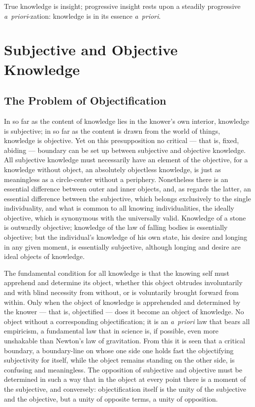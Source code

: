 \documentclass[12pt]{book}
\begin{document}
True knowledge is insight; progressive insight rests upon a steadily
progressive \textit{a~priori}-zation: knowledge is in its essence
\textit{a~priori}.

\chapter{Subjective and Objective Knowledge}

\section{The Problem of Objectification}
\label{sec:5}

\noindent In so far as the content of knowledge lies in the knower's own
interior, knowledge is subjective; in so far as the content is drawn from the
world of things, knowledge is objective. Yet on this presupposition no
critical --- that is, fixed, abiding --- boundary can be set up between
subjective and objective knowledge. All subjective knowledge must necessarily
have an element of the objective, for a knowledge without object, an absolutely
objectless knowledge, is just as meaningless as a circle-center without a
periphery. Nonetheless there is an essential difference between outer and inner
objects, and, as regards the latter, an essential difference between the
subjective, which belongs exclusively to the single individuality, and what is
common to all knowing individualities, the ideally objective, which is
synonymous with the universally valid. Knowledge of a stone is outwardly
objective; knowledge of the law of falling bodies is essentially objective; but
the individual's knowledge of his own state, his desire and longing in any
given moment, is essentially subjective, although longing and desire are ideal
objects of knowledge.

The fundamental condition for all knowledge is that the knowing self must
apprehend and determine its object, whether this object obtrudes involuntarily
and with blind necessity from without, or is voluntarily brought forward from
within. Only when the object of knowledge is apprehended and determined by the
knower --- that is, objectified --- does it become an object of knowledge. No
object without a corresponding objectification; it is an \textit{a~priori} law
that bears all empiricism, a fundamental law that in science is, if possible,
even more unshakable than Newton's law of gravitation. From this it is seen
that a critical boundary, a boundary-line on whose one side one holds fast the
objectifying subjectivity for itself, while the object remains standing on the
other side, is confusing and meaningless. The opposition of subjective and
objective must be determined in such a way that in the object at every point
there is a moment of the subjective, and conversely: objectification itself is
the unity of the subjective and the objective, but a unity of opposite terms,
a unity of opposition.
\end{document}
